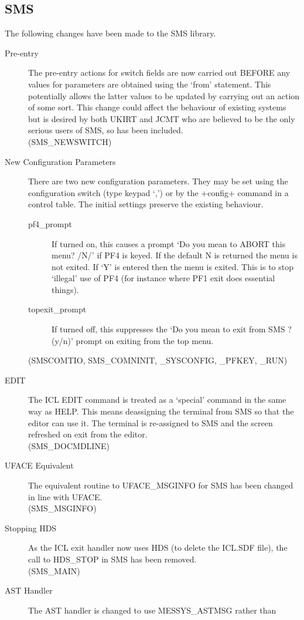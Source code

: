 \subsection{SMS}
The following changes have been made to the SMS library.
\begin{description}
\item[Pre-entry] The pre-entry actions for switch fields are now carried out
BEFORE any  values for parameters are obtained using the `from' statement. 
This potentially allows the latter values to be updated by carrying out an
action of some sort.  This change could affect the behaviour of existing systems
but is desired by both UKIRT and JCMT who are believed to be the only serious
users of SMS, so has been included.\\
(SMS\_NEWSWITCH)
\item[New Configuration Parameters] There are two new configuration parameters.
They may be set using the configuration switch (type keypad `,') or by the
+config+ command in a control table. The initial settings preserve the existing 
behaviour.
\begin{description}
\item[pf4\_prompt]
If turned on, this causes a prompt `Do you mean to ABORT this menu? /N/' if
PF4 is keyed.
If the default N is returned the menu is not exited. If `Y' is entered then
the menu is exited.  This is to stop `illegal' use of PF4 (for instance where
PF1 exit does essential things).
\item[topexit\_prompt] If turned off, this suppresses the `Do you mean to exit
from SMS ? (y/n)' prompt on exiting from the top menu.
\end{description}
(SMSCOMTIO, SMS\_COMNINIT, \_SYSCONFIG, \_PFKEY, \_RUN)
\item[EDIT] The ICL EDIT command is treated as a `special' command in the same
way as HELP. This means deassigning the terminal from SMS so that the editor
can use it. The terminal is re-assigned to SMS and the screen refreshed on
exit from the editor.\\
(SMS\_DOCMDLINE)
\item[UFACE Equivalent] The equivalent routine to UFACE\_MSGINFO for SMS has
been changed in line with UFACE.\\
(SMS\_MSGINFO)
\item[Stopping HDS] As the ICL exit handler now uses HDS (to delete the ICL.SDF
file), the call to HDS\_STOP in SMS has been removed.\\
(SMS\_MAIN)
\item[AST Handler] The AST handler is changed to use MESSYS\_ASTMSG rather than

\end{description}

